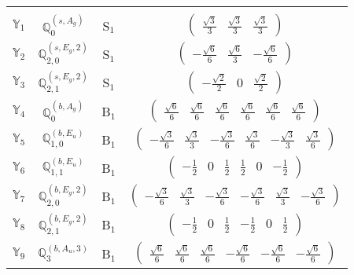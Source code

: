 \documentclass[fleqn,10pt,landscape]{article}
\begin{document}
\begin{itemize}
\begin{center}
\begin{longtable}{c|c|c|c}
 \hline \hline
\multicolumn{3}{r}{} \\ \endlastfoot

$ \mathbb{Y}_{1} $ & $\mathbb{Q}_{0}^{(s,A_{g})}$ & S$_{1}$ & $\begin{pmatrix} \frac{\sqrt{3}}{3} & \frac{\sqrt{3}}{3} & \frac{\sqrt{3}}{3} \end{pmatrix}$ \\
$ \mathbb{Y}_{2} $ & $\mathbb{Q}_{2,0}^{(s,E_{g},2)}$ & S$_{1}$ & $\begin{pmatrix} - \frac{\sqrt{6}}{6} & \frac{\sqrt{6}}{3} & - \frac{\sqrt{6}}{6} \end{pmatrix}$ \\
$ \mathbb{Y}_{3} $ & $\mathbb{Q}_{2,1}^{(s,E_{g},2)}$ & S$_{1}$ & $\begin{pmatrix} - \frac{\sqrt{2}}{2} & 0 & \frac{\sqrt{2}}{2} \end{pmatrix}$ \\ \hline
$ \mathbb{Y}_{4} $ & $\mathbb{Q}_{0}^{(b,A_{g})}$ & B$_{1}$ & $\begin{pmatrix} \frac{\sqrt{6}}{6} & \frac{\sqrt{6}}{6} & \frac{\sqrt{6}}{6} & \frac{\sqrt{6}}{6} & \frac{\sqrt{6}}{6} & \frac{\sqrt{6}}{6} \end{pmatrix}$ \\
$ \mathbb{Y}_{5} $ & $\mathbb{Q}_{1,0}^{(b,E_{u})}$ & B$_{1}$ & $\begin{pmatrix} - \frac{\sqrt{3}}{6} & \frac{\sqrt{3}}{3} & - \frac{\sqrt{3}}{6} & \frac{\sqrt{3}}{6} & - \frac{\sqrt{3}}{3} & \frac{\sqrt{3}}{6} \end{pmatrix}$ \\
$ \mathbb{Y}_{6} $ & $\mathbb{Q}_{1,1}^{(b,E_{u})}$ & B$_{1}$ & $\begin{pmatrix} - \frac{1}{2} & 0 & \frac{1}{2} & \frac{1}{2} & 0 & - \frac{1}{2} \end{pmatrix}$ \\
$ \mathbb{Y}_{7} $ & $\mathbb{Q}_{2,0}^{(b,E_{g},2)}$ & B$_{1}$ & $\begin{pmatrix} - \frac{\sqrt{3}}{6} & \frac{\sqrt{3}}{3} & - \frac{\sqrt{3}}{6} & - \frac{\sqrt{3}}{6} & \frac{\sqrt{3}}{3} & - \frac{\sqrt{3}}{6} \end{pmatrix}$ \\
$ \mathbb{Y}_{8} $ & $\mathbb{Q}_{2,1}^{(b,E_{g},2)}$ & B$_{1}$ & $\begin{pmatrix} - \frac{1}{2} & 0 & \frac{1}{2} & - \frac{1}{2} & 0 & \frac{1}{2} \end{pmatrix}$ \\
$ \mathbb{Y}_{9} $ & $\mathbb{Q}_{3}^{(b,A_{u},3)}$ & B$_{1}$ & $\begin{pmatrix} \frac{\sqrt{6}}{6} & \frac{\sqrt{6}}{6} & \frac{\sqrt{6}}{6} & - \frac{\sqrt{6}}{6} & - \frac{\sqrt{6}}{6} & - \frac{\sqrt{6}}{6} \end{pmatrix}$ \\

\end{longtable}
\end{center}
\end{itemize}
\end{document}
